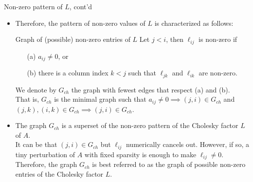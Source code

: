 \documentclass[t,usepdftitle=false]{beamer}
\begin{document}
\begin{frame}{Non-zero pattern of $L$, cont'd}
\begin{itemize}
\item Therefore, the pattern of non-zero values of $L$ is characterized as follows:
\begin{block}{Graph of (possible) non-zero entries of $L$}
Let $j<i$, then $\ell_{ij}$ is non-zero if\vspace{-.1cm}
\begin{itemize}
\item[(a)$\!\!$] $a_{ij}\neq 0$, or\vspace{-.1cm}
\item[(b)$\!\!$] there is a column index $k<j$ such that $\ell_{jk}$ and $\ell_{ik}$ are non-zero.\vspace{-.1cm}
\end{itemize}
We denote by $G_{ch}$ the graph with fewest edges that respect (a) and (b).\vspace{.1cm}\\
That is, $G_{ch}$ is the minimal graph such that $a_{ij}\neq 0\implies(j,i)\in G_{ch}$ and $(j,k),(i,k)\in G_{ch}\implies (j,i)\in G_{ch}$.
\end{block}
\item The graph $G_{ch}$ is a superset of the non-zero pattern of the Cholesky factor $L$ of $A$.\vspace{.1cm}\\
It can be that $(j,i)\in G_{ch}$ but $\ell_{ij}$ numerically cancels out.
However, if so, a tiny perturbation of $A$ with fixed sparsity is enough to make $\ell_{ij}\neq 0$.\vspace{.1cm}\\
Therefore, the graph $G_{ch}$ is best referred to as the graph of possible non-zero entries of the Cholesky factor $L$.
\end{itemize}
\end{frame}
\end{document}
